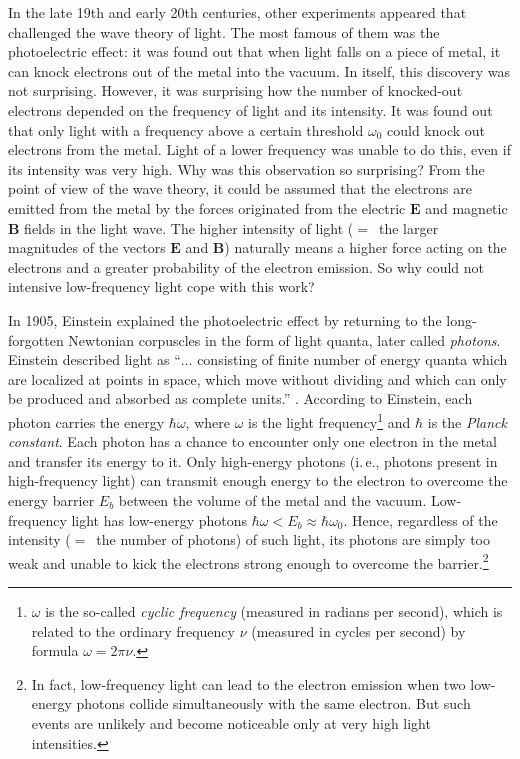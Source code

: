 \documentclass[nochecklpage]{stefan1}
\theoremstyle{definition}
\begin{document}
In the late 19th and early 20th centuries, other experiments appeared
that challenged the wave theory of light. The most famous of them was
the photoelectric effect: it was found out that when light falls on a
piece of metal, it can knock electrons out of the metal into the vacuum.
In itself, this discovery was not surprising. However, it was surprising
how the number of knocked-out electrons depended on the frequency of
light and its intensity. It was found out that only light with a
frequency above a certain threshold $ \omega_{0} $ could knock out
electrons from the metal. Light of a lower frequency was unable to do
this, even if its intensity was very high. Why was this observation so
surprising? From the point of view of the wave theory, it could be
assumed that the electrons are emitted from the metal by the forces
originated from the electric $ \boldsymbol{E} $ and magnetic
$ \boldsymbol{B} $ fields in the light wave. The higher intensity of
light ($=$~the larger magnitudes of the vectors $ \boldsymbol{E} $ and
$ \boldsymbol{B} $) naturally means a higher force acting on the
electrons and a greater probability of the electron emission. So why
could not intensive low-frequency light cope with this work?

In 1905, Einstein explained the photoelectric effect by returning to the
long-forgotten Newtonian corpuscles in the form of light quanta, later
called \emph{photons}. Einstein described light as
``$\ldots$ consisting of finite number of energy quanta which are localized at
points in space, which move without dividing and which can only be
produced and absorbed as complete units.'' \cite{Arons}. According
to Einstein, each photon carries the energy $ \hbar \omega $, where
$ \omega $ is the light frequency\footnote{$ \omega $ is the so-called
\emph{cyclic frequency} (measured in radians per second), which is related
to the ordinary frequency $ \nu $ (measured in cycles per second) by
formula $ \omega = 2 \pi \nu $.} and $ \hbar $ is the \emph{Planck}
\emph{constant}. Each photon has a chance to
encounter only one electron in the metal and transfer its energy to it.
Only high-energy photons (i.\,e., photons present in high-frequency light)
can transmit enough energy to the electron to overcome the energy
barrier $ E_{b} $ between the volume of the metal and the vacuum.
Low-frequency light has low-energy photons $ \hbar \omega <E_{b}
\approx \hbar \omega_{0} $. Hence, regardless of the intensity ($=$~the
number of photons) of such light, its photons are simply too weak and
unable to kick the electrons strong enough to overcome the
barrier.\footnote{In fact, low-frequency light can lead to the
electron emission when two low-energy photons collide simultaneously
with the same electron. But such events are unlikely and become
noticeable only at very high light intensities.}
\end{document}
